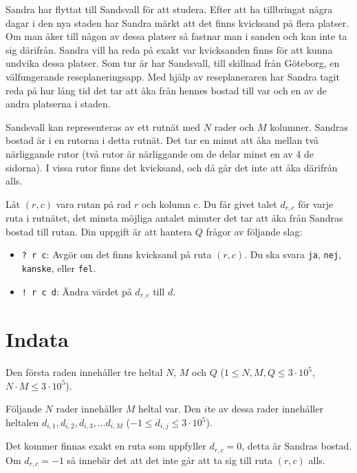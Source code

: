 \noindent



Sandra har flyttat till Sandsvall för att studera. Efter att ha tillbringat några dagar i den
nya staden har Sandra märkt att det finns kvicksand på flera platser. 
Om man åker till någon av dessa platser så fastnar man i sanden och kan inte ta sig därifrån.
Sandra vill ha reda på exakt var kvicksanden finns för att kunna undvika dessa platser.
Som tur är har Sandsvall, till skillnad från Göteborg, en välfungerande reseplaneringsapp.
Med hjälp av reseplaneraren har Sandra tagit reda på hur lång tid det tar att åka från 
hennes bostad till var och en av de andra platserna i staden.

Sandsvall kan representeras av ett rutnät med $N$ rader och $M$ kolumner. Sandras bostad
är i en rutorna i detta rutnät. Det tar en minut att åka mellan två närliggande rutor (två 
rutor är närliggande om de delar minst en av 4 de sidorna). I vissa rutor finns det kvicksand, och då går 
det inte att åka därifrån alls.

Låt $(r, c)$ vara rutan på rad $r$ och kolumn $c$. Du får givet talet $d_{r,c}$ för varje 
ruta i rutnätet, det minsta möjliga antalet minuter det tar att åka från Sandras bostad 
till rutan. Din uppgift är att hantera $Q$ frågor av följande slag:

\begin{itemize}
    \item \verb|? r c|: Avgör om det finns kvicksand på ruta $(r, c)$. Du ska svara 
    \verb|ja|, \verb|nej|, \verb|kanske|, eller \verb|fel|.
    \item \verb|! r c d|: Ändra värdet på $d_{r, c}$ till $d$.
\end{itemize}

\section*{Indata}

Den första raden innehåller tre heltal $N$, $M$ och $Q$
($1 \leq N,M,Q \leq 3 \cdot 10^5$, $N\cdot M \leq 3 \cdot 10^5$).

Följande $N$ rader innehåller $M$ heltal var. Den $i$te av dessa rader innehåller heltalen
$d_{i,1}, d_{i,2}, d_{i,3}, \dots d_{i,M}$ ($-1 \leq d_{i,j} \leq 3 \cdot 10^5$).

Det kommer finnas exakt en ruta som uppfyller $d_{r, c} = 0$, detta är Sandras bostad. Om 
$d_{r, c} = -1$ så innebär det att det inte går att ta sig till ruta $(r, c)$ alls.

